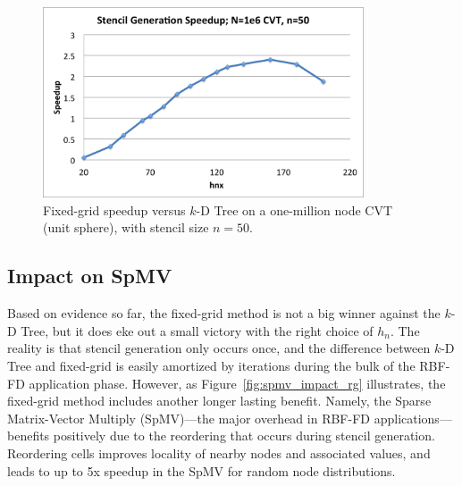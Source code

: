 \documentclass{report}
\begin{document}


\begin{figure}
\centering
\includegraphics[width=9.5cm]{../figures/stencils/cvt1m_stencil_gen_speedup.png}
\caption{Fixed-grid speedup versus $k$-D Tree on a one-million node CVT (unit sphere), with stencil size $n=50$.}
\label{fig:cvt_hn_speedup}
\end{figure}

\subsection{Impact on SpMV}

Based on evidence so far, the fixed-grid method is not a big winner against the $k$-D Tree, but it does eke out a small victory with the right choice of $h_n$. The reality is that stencil generation only occurs once, and the difference between $k$-D Tree and fixed-grid is easily amortized by iterations during the bulk of the RBF-FD application phase. However, as Figure~\ref{fig:spmv_impact_rg} illustrates, the fixed-grid method includes another longer lasting benefit. Namely, the Sparse Matrix-Vector Multiply (SpMV)---the major overhead in RBF-FD applications---benefits positively due to the reordering that occurs during stencil generation. Reordering cells improves locality of nearby nodes and associated values, and leads to up to 5x speedup in the SpMV for random node distributions. 
\end{document}
